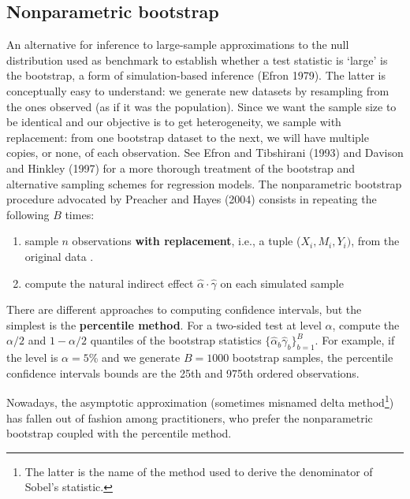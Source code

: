 \documentclass[
  11pt,
  letterpaper,
]{scrbook}
\providecommand{\tightlist}{%
  \setlength{\itemsep}{0pt}\setlength{\parskip}{0pt}}\usepackage{longtable,booktabs,array}
\theoremstyle{definition}
\theoremstyle{definition}
\theoremstyle{remark}
\begin{document}
\subsection{Nonparametric bootstrap}\label{nonparametric-bootstrap}

An alternative for inference to large-sample approximations to the null
distribution used as benchmark to establish whether a test statistic is
`large' is the bootstrap, a form of simulation-based inference (Efron
1979). The latter is conceptually easy to understand: we generate new
datasets by resampling from the ones observed (as if it was the
population). Since we want the sample size to be identical and our
objective is to get heterogeneity, we sample with replacement: from one
bootstrap dataset to the next, we will have multiple copies, or none, of
each observation. See Efron and Tibshirani (1993) and Davison and
Hinkley (1997) for a more thorough treatment of the bootstrap and
alternative sampling schemes for regression models. The nonparametric
bootstrap procedure advocated by Preacher and Hayes (2004) consists in
repeating the following \(B\) times:

\begin{enumerate}
\def\labelenumi{\arabic{enumi})}
\tightlist
\item
  sample \(n\) observations \textbf{with replacement}, i.e., a tuple
  (\(X_i, M_i, Y_i)\), from the original data .
\item
  compute the natural indirect effect
  \(\widehat{\alpha}\cdot\widehat{\gamma}\) on each simulated sample
\end{enumerate}

There are different approaches to computing confidence intervals, but
the simplest is the \textbf{percentile method}. For a two-sided test at
level \(\alpha\), compute the \(\alpha/2\) and \(1-\alpha/2\) quantiles
of the bootstrap statistics
\(\{\widehat{\alpha}_b\widehat{\gamma}_b\}_{b=1}^B\). For example, if
the level is \(\alpha=5\)\% and we generate \(B=1000\) bootstrap
samples, the percentile confidence intervals bounds are the 25th and
975th ordered observations.

Nowadays, the asymptotic approximation (sometimes misnamed delta
method\footnote{The latter is the name of the method used to derive the
  denominator of Sobel's statistic.}) has fallen out of fashion among
practitioners, who prefer the nonparametric bootstrap coupled with the
percentile method.
\end{document}
